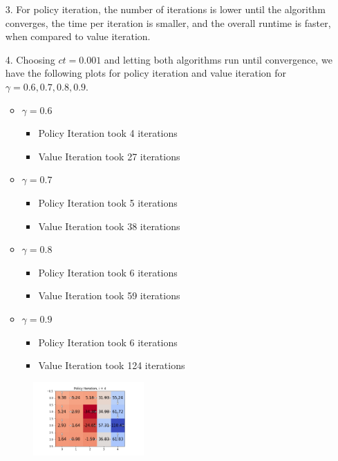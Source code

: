 \documentclass[submit]{harvardml}
\begin{document}
\begin{itemize}
\\
\\
\\
\newpage
    \item[3.] For policy iteration, the number of iterations is lower until the algorithm converges, the time per iteration is smaller, and the overall runtime is faster, when compared to value iteration.
    \item[4.]
    Choosing $ct = 0.001$ and letting both algorithms run until convergence, we have the following plots for policy iteration and value iteration for $\gamma = 0.6, 0.7, 0.8, 0.9$.
    \begin{itemize}
        \item $\gamma = 0.6$
        \begin{itemize}
            \item Policy Iteration took 4 iterations
            \item Value Iteration took 27 iterations
        \end{itemize}
        \item $\gamma = 0.7$
        \begin{itemize}
            \item Policy Iteration took 5 iterations
            \item Value Iteration took 38 iterations
        \end{itemize}
        \item $\gamma = 0.8$
        \begin{itemize}
            \item Policy Iteration took 6 iterations
            \item Value Iteration took 59 iterations
        \end{itemize}
        \item $\gamma = 0.9$
        \begin{itemize}
            \item Policy Iteration took 6 iterations
            \item Value Iteration took 124 iterations
        \end{itemize}
    \end{itemize}
    \begin{figure}[h!]
        \includegraphics[width=0.4\textwidth]{HW6/Gamma_Policy_4.png}

\end{figure}
\end{itemize}
\end{document}

